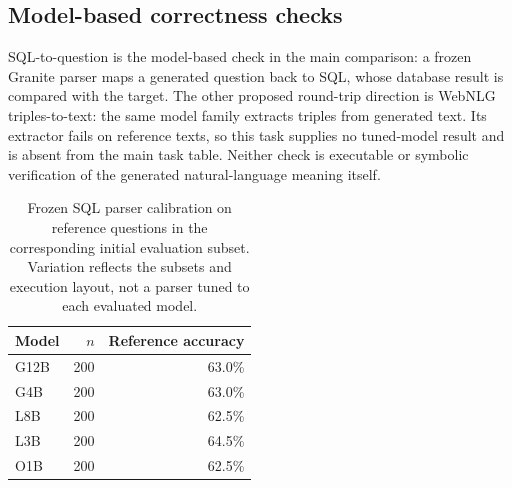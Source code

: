 \subsection{Model-based correctness checks}
SQL-to-question is the model-based check in the main comparison: a frozen Granite parser maps a generated question back to SQL, whose database result is compared with the target. The other proposed round-trip direction is WebNLG triples-to-text: the same model family extracts triples from generated text. Its extractor fails on reference texts, so this task supplies no tuned-model result and is absent from the main task table. Neither check is executable or symbolic verification of the generated natural-language meaning itself.
\begin{table}[t]\centering\small
\begin{tabular}{lrr}\toprule Model & $n$ & Reference accuracy \\\midrule
G12B & 200 & 63.0\% \\
G4B & 200 & 63.0\% \\
L8B & 200 & 62.5\% \\
L3B & 200 & 64.5\% \\
O1B & 200 & 62.5\% \\
\bottomrule\end{tabular}
\caption{Frozen SQL parser calibration on reference questions in the corresponding initial evaluation subset. Variation reflects the subsets and execution layout, not a parser tuned to each evaluated model.}\label{tab:parser-calibration}\end{table}
